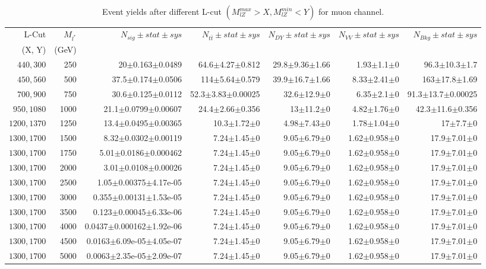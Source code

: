 \documentclass[]{article}
\begin{document}
\begin{table}
\begin{center}
\scriptsize{
\begin{tabular}{ |r|r|r|r|r|r|r|}
\hline 
L-Cut & $M_{l^*}$ & $N_{sig}\pm stat \pm sys $ &$N_{t\bar{t}}\pm stat \pm sys $ & $N_{DY}\pm stat \pm sys $ & $N_{VV}\pm stat \pm sys $ &$N_{Bkg}\pm stat \pm sys$\\
(X, Y) & (GeV) & && &&\\
\hline 
$440, 300$ & 250 & 20$\pm$0.163$\pm$0.0489 & 64.6$\pm$4.27$\pm$0.812 & 29.8$\pm$9.36$\pm$1.66 & 1.93$\pm$1.1$\pm$0 & 96.3$\pm$10.3$\pm$1.7 \\
$450, 560$ & 500 & 37.5$\pm$0.174$\pm$0.0506 & 114$\pm$5.64$\pm$0.579 & 39.9$\pm$16.7$\pm$1.66 & 8.33$\pm$2.41$\pm$0 & 163$\pm$17.8$\pm$1.69 \\
$700, 900$ & 750 & 30.6$\pm$0.125$\pm$0.0112 & 52.3$\pm$3.83$\pm$0.00025 & 32.6$\pm$12.9$\pm$0 & 6.35$\pm$2.1$\pm$0 & 91.3$\pm$13.7$\pm$0.00025 \\
$950, 1080$ & 1000 & 21.1$\pm$0.0799$\pm$0.00607 & 24.4$\pm$2.66$\pm$0.356 & 13$\pm$11.2$\pm$0 & 4.82$\pm$1.76$\pm$0 & 42.3$\pm$11.6$\pm$0.356 \\
$1200, 1370$ & 1250 & 13.4$\pm$0.0495$\pm$0.00365 & 10.3$\pm$1.72$\pm$0 & 4.98$\pm$7.43$\pm$0 & 1.78$\pm$1.04$\pm$0 & 17$\pm$7.7$\pm$0 \\
$1300, 1700$ & 1500 & 8.32$\pm$0.0302$\pm$0.00119 & 7.24$\pm$1.45$\pm$0 & 9.05$\pm$6.79$\pm$0 & 1.62$\pm$0.958$\pm$0 & 17.9$\pm$7.01$\pm$0 \\
$1300, 1700$ & 1750 & 5.01$\pm$0.0186$\pm$0.000462 & 7.24$\pm$1.45$\pm$0 & 9.05$\pm$6.79$\pm$0 & 1.62$\pm$0.958$\pm$0 & 17.9$\pm$7.01$\pm$0 \\
$1300, 1700$ & 2000 & 3.01$\pm$0.0108$\pm$0.00026 & 7.24$\pm$1.45$\pm$0 & 9.05$\pm$6.79$\pm$0 & 1.62$\pm$0.958$\pm$0 & 17.9$\pm$7.01$\pm$0 \\
$1300, 1700$ & 2500 & 1.05$\pm$0.00375$\pm$4.17e-05 & 7.24$\pm$1.45$\pm$0 & 9.05$\pm$6.79$\pm$0 & 1.62$\pm$0.958$\pm$0 & 17.9$\pm$7.01$\pm$0 \\
$1300, 1700$ & 3000 & 0.355$\pm$0.00131$\pm$1.53e-05 & 7.24$\pm$1.45$\pm$0 & 9.05$\pm$6.79$\pm$0 & 1.62$\pm$0.958$\pm$0 & 17.9$\pm$7.01$\pm$0 \\
$1300, 1700$ & 3500 & 0.123$\pm$0.00045$\pm$6.33e-06 & 7.24$\pm$1.45$\pm$0 & 9.05$\pm$6.79$\pm$0 & 1.62$\pm$0.958$\pm$0 & 17.9$\pm$7.01$\pm$0 \\
$1300, 1700$ & 4000 & 0.0437$\pm$0.000162$\pm$1.92e-06 & 7.24$\pm$1.45$\pm$0 & 9.05$\pm$6.79$\pm$0 & 1.62$\pm$0.958$\pm$0 & 17.9$\pm$7.01$\pm$0 \\
$1300, 1700$ & 4500 & 0.0163$\pm$6.09e-05$\pm$4.05e-07 & 7.24$\pm$1.45$\pm$0 & 9.05$\pm$6.79$\pm$0 & 1.62$\pm$0.958$\pm$0 & 17.9$\pm$7.01$\pm$0 \\
$1300, 1700$ & 5000 & 0.0063$\pm$2.35e-05$\pm$2.09e-07 & 7.24$\pm$1.45$\pm$0 & 9.05$\pm$6.79$\pm$0 & 1.62$\pm$0.958$\pm$0 & 17.9$\pm$7.01$\pm$0 \\
\hline 
\end{tabular}
}
\end{center}
\caption{Event yields after different L-cut $(M_{lZ}^{max} > X, M_{lZ}^{min} < Y)$ for muon channel.}
\end{table}
\end{document}
